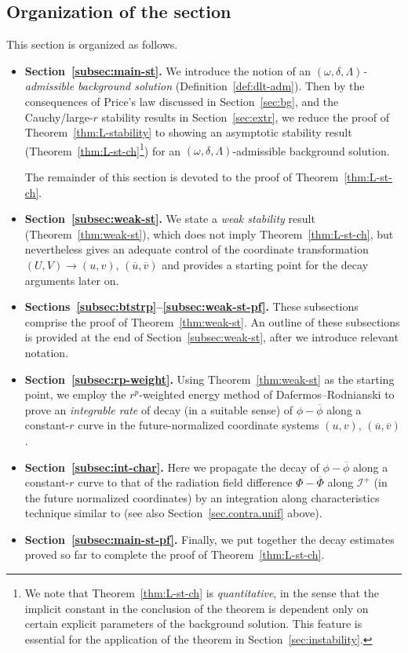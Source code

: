 \documentclass[10pt, reqno]{amsart}
\theoremstyle{definition}
\theoremstyle{remark}
\theoremstyle{conjecture}
\numberwithin{equation}{section}
\newcommand{\0}{\emptyset}
\newcommand{\dlt}{\delta}
\newcommand{\Lmb}{\Lambda}
\newcommand{\omg}{\omega}
\newcommand{\calH}{\mathcal H}
\newcommand{\calI}{\mathcal I}
\newcommand{\EH}{\calH^{+}}
\newcommand{\NI}{\calI^{+}}						%
\newcommand{\ubg}{\overline{u}}					%
\newcommand{\vbg}{\overline{v}}					%
\newcommand{\phibg}{\overline{\phi}}				%
\newcommand{\Phibg}{\overline{\Phi}}				%
\begin{document}
\subsection{Organization of the section}
This section is organized as follows.
\begin{itemize}
\item {\bf Section~\ref{subsec:main-st}.} We introduce the notion of an \emph{$(\omg, \dlt, \Lmb)$-admissible background solution} (Definition~\ref{def:dlt-adm}). Then by the consequences of Price's law discussed in Section~\ref{sec:bg}, and the Cauchy/large-$r$ stability results in Section~\ref{sec:extr}, we reduce the proof of Theorem~\ref{thm:L-stability} to showing an asymptotic stability result (Theorem~\ref{thm:L-st-ch}\footnote{We note that Theorem~\ref{thm:L-st-ch} is \emph{quantitative}, in the sense that the implicit constant in the conclusion of the theorem is dependent only on certain explicit parameters of the background solution. This feature is essential for the application of the theorem in Section~\ref{sec:instability}.}) for an $(\omg, \dlt, \Lmb)$-admissible background solution. 

The remainder of this section is devoted to the proof of Theorem~\ref{thm:L-st-ch}. 
\item {\bf Section~\ref{subsec:weak-st}.} We state a \emph{weak stability} result (Theorem~\ref{thm:weak-st}), which does not imply Theorem~\ref{thm:L-st-ch}, but nevertheless gives an adequate control of the coordinate transformation $(U, V) \to (u, v), \, (\ubg, \vbg)$ and provides a starting point for the decay arguments later on.
\item {\bf Sections~\ref{subsec:btstrp}--\ref{subsec:weak-st-pf}.} These subsections comprise the proof of Theorem~\ref{thm:weak-st}. An outline of these subsections is provided at the end of Section~\ref{subsec:weak-st}, after we introduce relevant notation.
\item {\bf Section~\ref{subsec:rp-weight}.} Using Theorem~\ref{thm:weak-st} as the starting point, we employ the $r^{p}$-weighted energy method of Dafermos--Rodnianski \cite{DRNM} to prove an \emph{integrable rate} of decay (in a suitable sense) of $\phi - \phibg$ along a constant-$r$ curve in the future-normalized coordinate systems $(u, v), \, (\ubg, \vbg)$. 
\item {\bf Section~\ref{subsec:int-char}.} Here we propagate the decay of $\phi - \phibg$ along a constant-$r$ curve to that of the radiation field difference $\Phi - \Phibg$ along $\NI$ (in the future normalized coordinates) by an integration along characteristics technique similar to \cite{LO1} (see also Section~\ref{sec.contra.unif} above).
\item {\bf Section~\ref{subsec:main-st-pf}.} Finally, we put together the decay estimates proved so far to complete the proof of Theorem~\ref{thm:L-st-ch}.
\end{itemize}
\end{document}
